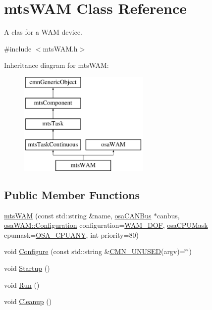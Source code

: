 \hypertarget{classmts_w_a_m}{}\section{mts\+W\+A\+M Class Reference}
\label{classmts_w_a_m}


A clas for a W\+A\+M device.  




{\ttfamily \#include $<$mts\+W\+A\+M.\+h$>$}

Inheritance diagram for mts\+W\+A\+M\+:\begin{figure}[H]
\begin{center}
\leavevmode
\includegraphics[height=5.000000cm]{d9/d45/classmts_w_a_m}
\end{center}
\end{figure}
\subsection*{Public Member Functions}
\begin{DoxyCompactItemize}
\item 
\hyperlink{classmts_w_a_m_a21fd1872a7f226ad67152896a5cb2909}{mts\+W\+A\+M} (const std\+::string \&name, \hyperlink{classosa_c_a_n_bus}{osa\+C\+A\+N\+Bus} $\ast$canbus, \hyperlink{classosa_w_a_m_ada0b00e10e6401b6b1801cd08f30748b}{osa\+W\+A\+M\+::\+Configuration} configuration=\hyperlink{classosa_w_a_m_ada0b00e10e6401b6b1801cd08f30748ba1bdf2662bd26c893783934b814db4ac3}{W\+A\+M\+\_\+D\+O\+F}, \hyperlink{osa_c_p_u_affinity_8h_aaec7cdd7797e5e6eb5438c15fee5477a}{osa\+C\+P\+U\+Mask} cpumask=\hyperlink{osa_c_p_u_affinity_8h_a2ae5ea257830cff2814d81ce526ada35}{O\+S\+A\+\_\+\+C\+P\+U\+A\+N\+Y}, int priority=80)
\item 
void \hyperlink{classmts_w_a_m_a116d9eaaa932057699aab1fd4a8cd71e}{Configure} (const std\+::string \&\hyperlink{cmn_portability_8h_a021894e2626935fa2305434b1e893ff6}{C\+M\+N\+\_\+\+U\+N\+U\+S\+E\+D}(argv)=\char`\"{}\char`\"{})
\item 
void \hyperlink{classmts_w_a_m_a30637b31116e47f42251b0c802257228}{Startup} ()
\item 
void \hyperlink{classmts_w_a_m_a3e630eeac8155b8c6a61ef3abfb0d14f}{Run} ()
\item 
void \hyperlink{classmts_w_a_m_a6271503261b6ff57b615fd78dd5bcc13}{Cleanup} ()
\end{DoxyCompactItemize}
